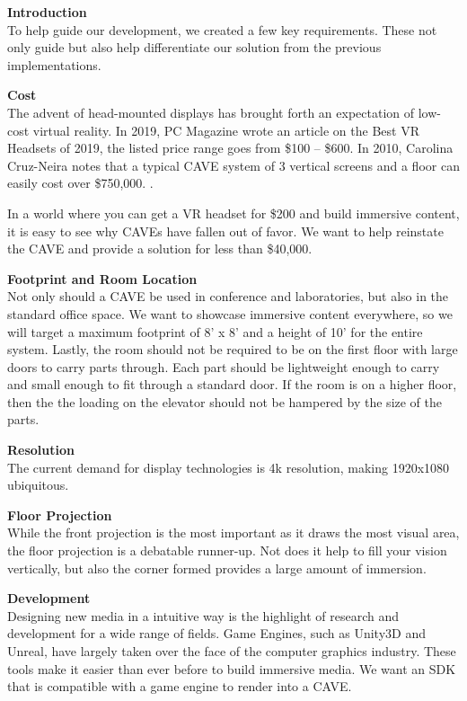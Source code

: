 
\noindent\textbf{Introduction}\\
	To help guide our development, we created a few key requirements. These not only guide but also help differentiate our solution from the previous implementations.

\filbreak
\noindent\textbf{Cost}\\
	The advent of head-mounted displays has brought forth an expectation of low-cost virtual reality. In 2019, PC Magazine  wrote an article on the Best VR Headsets of 2019, the listed price range goes from \$100 -- \$600. \cite{bestHMDs} 
	In 2010, Carolina Cruz-Neira notes that a typical CAVE system of 3 vertical screens and a floor can easily cost over \$750,000. \cite{ccnSurround}. 
	
	In a world where you can get a VR headset for \$200 and build immersive content, it is easy to see why CAVEs have fallen out of favor. We want to help reinstate the CAVE and provide a solution for less than \$40,000.

\filbreak
\noindent\textbf{Footprint and Room Location}\\
	Not only should a CAVE be used in conference and laboratories, but also in the standard office space. We want to showcase immersive content everywhere, so we will target a maximum footprint of 8' x 8' and a height of 10' for the entire system. 
	Lastly, the room should not be required to be on the first floor with large doors to carry parts through. Each part should be lightweight enough to carry and small enough to fit through a standard door. If the room is on a higher floor, then the the loading on the elevator should not be hampered by the size of the parts.

\filbreak
\noindent\textbf{Resolution}\\
	The current demand for display technologies is 4k resolution, making 1920x1080 ubiquitous.

\filbreak
\noindent\textbf{Floor Projection}\\
	While the front projection is the most important as it draws the most visual area, the floor projection is a debatable runner-up. Not does it help to fill your vision vertically, but also the corner formed provides a large amount of immersion.
	
\filbreak
\noindent\textbf{Development}\\
	Designing new media in a intuitive way is the highlight of research and development for a wide range of fields. Game Engines, such as Unity3D and Unreal, have largely taken over the face of the computer graphics industry. These tools make it easier than ever before to build immersive media. We want an SDK that is compatible with a game engine to render into a CAVE.

